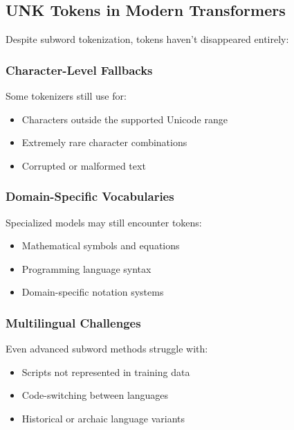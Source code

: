 \subsection{UNK Tokens in Modern Transformers}

Despite subword tokenization, \unk{} tokens haven't disappeared entirely:

\subsubsection{Character-Level Fallbacks}
Some tokenizers still use \unk{} for:
\begin{itemize}
\item Characters outside the supported Unicode range
\item Extremely rare character combinations
\item Corrupted or malformed text
\end{itemize}

\subsubsection{Domain-Specific Vocabularies}
Specialized models may still encounter \unk{} tokens:
\begin{itemize}
\item Mathematical symbols and equations
\item Programming language syntax
\item Domain-specific notation systems
\end{itemize}

\subsubsection{Multilingual Challenges}
Even advanced subword methods struggle with:
\begin{itemize}
\item Scripts not represented in training data
\item Code-switching between languages
\item Historical or archaic language variants
\end{itemize}

